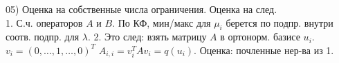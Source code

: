 05) Оценка на собственные числа ограничения. Оценка на след.\\

1. С.ч. операторов $A$ и $B$. По КФ, мин/макс для $\mu_i$ берется по подпр. внутри соотв. подпр. для $\lambda$. 2. Это след: взять матрицу $A$ в ортонорм. базисе $u_i$. $v_i = (0,\dots,1,\dots,0)^T$ $A_{i,i} = v_i^TAv_i = q(u_i)$. Оценка: почленные нер-ва из 1.\\
